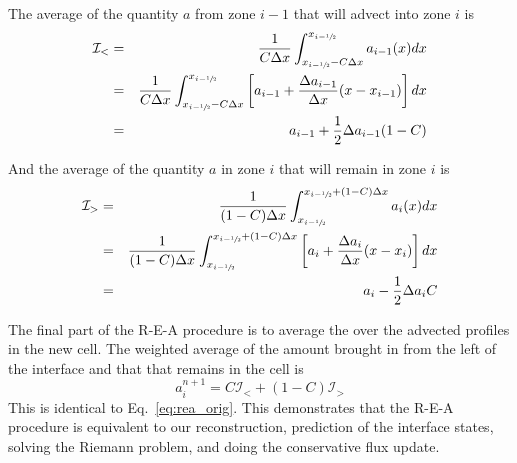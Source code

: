 The average of the quantity $a$ from zone $i-1$ that will advect into
zone $i$ is 
\begin{eqnarray}
\mathcal{I}_< &=& \frac{1}{C \Delta x} 
   \int_{x_{i-\myhalf} - C\Delta x}^{x_{i-\myhalf}} a_{i-1}(x) dx \\
%
 &=& \frac{1}{C \Delta x} 
   \int_{x_{i-\myhalf} - C\Delta x}^{x_{i-\myhalf}}
        \left [ a_{i-1} + \frac{\Delta a_{i-1}}{\Delta x} (x - x_{i-1} ) \right ] dx  \\
 &=& a_{i-1} + \frac{1}{2} \Delta a_{i-1} (1-C)
\end{eqnarray}

And the average of the quantity $a$ in zone $i$ that will remain in zone $i$
is
\begin{eqnarray}
\mathcal{I}_> &=& \frac{1}{(1-C) \Delta x} 
   \int_{x_{i-\myhalf}}^{x_{i-\myhalf} + (1-C) \Delta x} a_{i}(x) dx \\
%
 &=& \frac{1}{(1-C) \Delta x} 
   \int_{x_{i-\myhalf}}^{x_{i-\myhalf} + (1-C)\Delta x} 
        \left [ a_{i} + \frac{\Delta a_{i}}{\Delta x} (x - x_{i} ) \right ] dx  \\
 &=& a_{i} - \frac{1}{2} \Delta a_{i} C
\end{eqnarray}

The final part of the R-E-A procedure is to average the over the 
advected profiles in the new cell.  The weighted average of the
amount brought in from the left of the interface and that that remains
in the cell is
\begin{equation}
a_i^{n+1} = C \mathcal{I}_< + (1 - C) \mathcal{I}_> 
\end{equation}          
This is identical to Eq.~\ref{eq:rea_orig}.   This demonstrates that the
R-E-A procedure is equivalent to our reconstruction, prediction of the
interface states, solving the Riemann problem, and doing the 
conservative flux update.

